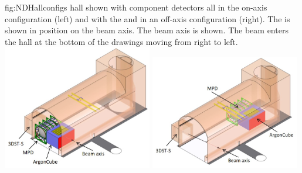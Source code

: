 \begin{dunefigure}{fig:NDHallconfigs}
{  hall shown with component detectors all in the on-axis configuration (left) and with the  and  in an off-axis configuration (right). The  is shown in position on the beam axis. The beam axis is shown.  The beam enters the hall at the bottom of the drawings moving from right to left.}
\includegraphics[width=0.49\textwidth]{graphics/NDHall_onaxis.jpg}
\includegraphics[width=0.49\textwidth]{graphics/NDHall_offaxis.jpg}
\end{dunefigure}



